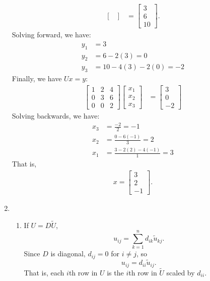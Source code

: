 \documentclass[12pt,letterpaper]{article}
\begin{document}
\begin{enumerate}
\begin{align*}
\begin{bmatrix}
      \end{bmatrix}
      &=
      \begin{bmatrix}
        3 \\ 6 \\ 10
      \end{bmatrix}.
    \end{align*}
    Solving forward, we have:
    \begin{align*}
      y_1 &= 3 \\
      y_2 &= 6-2(3) = 0 \\
      y_3 &= 10-4(3)-2(0) = -2
    \end{align*}
    Finally, we have $Ux=y$:
    \begin{align*}
      \begin{bmatrix}
        1 & 2 & 4 \\
        0 & 3 & 6 \\
        0 & 0 & 2
      \end{bmatrix}
      \begin{bmatrix}
        x_1 \\ x_2 \\ x_3
      \end{bmatrix}
      &=
      \begin{bmatrix}
        3 \\ 0 \\ -2
      \end{bmatrix}
    \end{align*}
    Solving backwards, we have:
    \begin{align*}
      x_3 &= \frac{-2}{2} = -1 \\
      x_2 &= \frac{0-6(-1)}{3} = 2 \\
      x_1 &= \frac{3-2(2)-4(-1)}{1} = 3
    \end{align*}
    That is,
    \begin{align*}
      x =
      \begin{bmatrix}
        3 \\ 2 \\ -1
      \end{bmatrix}.
    \end{align*}

  \item
    \begin{enumerate}
      \item If $U=D\tilde{U}$, \[u_{ij} = \sum_{k=1}^n{d_{ik}\tilde{u}_{kj}}.\]
        Since $D$ is diagonal, $d_{ij} = 0$ for $i \neq j$, so \[u_{ij}
        = d_{ii}\tilde{u}_{ij}.\] That is, each $i$th row in $U$ is the $i$th
        row in $\tilde{U}$ scaled by $d_{ii}$.


\end{enumerate}
\end{enumerate}
\end{document}
